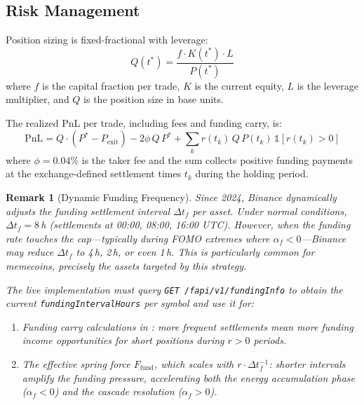 \documentclass[11pt,a4paper]{article}
\newtheorem{remark}{Remark}[section]
\newcommand{\af}{\alpha_f}
\newcommand{\Ffund}{F_{\mathrm{fund}}}
\begin{document}
\subsection{Risk Management}

Position sizing is fixed-fractional with leverage:
\begin{equation}
\label{eq:sizing}
Q(t^*) = \frac{f \cdot K(t^*) \cdot L}{P(t^*)}
\end{equation}
where $f$ is the capital fraction per trade, $K$ is the current equity, 
$L$ is the leverage multiplier, and $Q$ is the position size in base units.

The realized PnL per trade, including fees and funding carry, is:
\begin{equation}
\label{eq:pnl}
\mathrm{PnL} = Q \cdot (P^* - P_{\mathrm{exit}}) - 2\phi\,Q\,P^* 
+ \sum_{k} r(t_k)\,Q\,P(t_k)\,\mathbb{1}[r(t_k) > 0]
\end{equation}
where $\phi = 0.04\%$ is the taker fee and the sum collects positive funding 
payments at the exchange-defined settlement times $t_k$ during the holding 
period.

\begin{remark}[Dynamic Funding Frequency]
\label{rem:funding_freq}
Since 2024, Binance dynamically adjusts the funding settlement interval 
$\Delta t_f$ per asset. Under normal conditions, $\Delta t_f = 8$\,h 
(settlements at 00:00, 08:00, 16:00 UTC). However, when the funding rate 
touches the cap---typically during FOMO extremes where $\af < 0$---Binance 
may reduce $\Delta t_f$ to 4\,h, 2\,h, or even 1\,h. This is particularly 
common for memecoins, precisely the assets targeted by this strategy.

The live implementation must query \texttt{GET /fapi/v1/fundingInfo} to obtain 
the current \texttt{fundingIntervalHours} per symbol and use it for:
\begin{enumerate}[nosep]
    \item Funding carry calculations in : more frequent 
    settlements mean more funding income opportunities for short positions 
    during $r > 0$ periods.
    \item The effective spring force $\Ffund$, which scales with 
    $r \cdot \Delta t_f^{-1}$: shorter intervals amplify the funding 
    pressure, accelerating both the energy accumulation phase ($\af < 0$) 
    and the cascade resolution ($\af > 0$).
\end{enumerate}
\end{remark}
\end{document}

